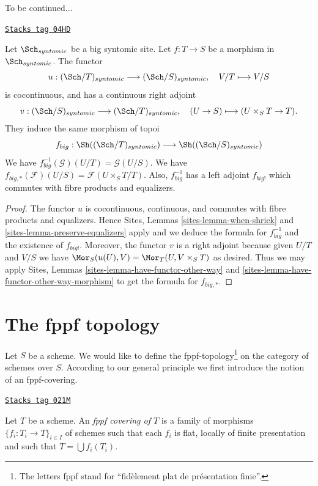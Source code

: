 To be continued...

\begin{lemma}
\label{topologies-lemma-morphism-big-syntomic}
\href{https://stacks.math.columbia.edu/tag/04HD}{\texttt{Stacks tag 04HD}}

Let $\Sch_{syntomic}$ be a big syntomic site.
Let $f : T \to S$ be a morphism in $\Sch_{syntomic}$.
The functor
$$
u : (\Sch/T)_{syntomic} \longrightarrow (\Sch/S)_{syntomic},
\quad
V/T \longmapsto V/S
$$
is cocontinuous, and has a continuous right adjoint
$$
v : (\Sch/S)_{syntomic} \longrightarrow (\Sch/T)_{syntomic},
\quad
(U \to S) \longmapsto (U \times_S T \to T).
$$
They induce the same morphism of topoi
$$
f_{big} :
\Sh((\Sch/T)_{syntomic})
\longrightarrow
\Sh((\Sch/S)_{syntomic})
$$
We have $f_{big}^{-1}(\mathcal{G})(U/T) = \mathcal{G}(U/S)$.
We have $f_{big, *}(\mathcal{F})(U/S) = \mathcal{F}(U \times_S T/T)$.
Also, $f_{big}^{-1}$ has a left adjoint $f_{big!}$ which commutes with
fibre products and equalizers.
\end{lemma}

\begin{proof}
The functor $u$ is cocontinuous, continuous, and commutes with fibre products
and equalizers. Hence
Sites, Lemmas \ref{sites-lemma-when-shriek} and
\ref{sites-lemma-preserve-equalizers}
apply and we deduce the formula
for $f_{big}^{-1}$ and the existence of $f_{big!}$. Moreover,
the functor $v$ is a right adjoint because given $U/T$ and $V/S$
we have $\Mor_S(u(U), V) = \Mor_T(U, V \times_S T)$
as desired. Thus we may apply
Sites, Lemmas \ref{sites-lemma-have-functor-other-way} and
\ref{sites-lemma-have-functor-other-way-morphism} to get the
formula for $f_{big, *}$.
\end{proof}

\section{The fppf topology}
\label{topologies-section-fppf}
Let $S$ be a scheme. We would like to define the fppf-topology\footnote{
The letters fppf stand for ``fid\`element plat de pr\'esentation finie''.} on
the category of schemes over $S$. According to our general principle
we first introduce the notion of an fppf-covering.

\begin{definition}
\label{topologies-definition-fppf-covering}
\href{https://stacks.math.columbia.edu/tag/021M}{\texttt{Stacks tag 021M}}

Let $T$ be a scheme. An {\it fppf covering of $T$} is a family
of morphisms $\{f_i : T_i \to T\}_{i \in I}$ of schemes
such that each $f_i$ is flat, locally of finite presentation and such
that $T = \bigcup f_i(T_i)$.
\end{definition}

